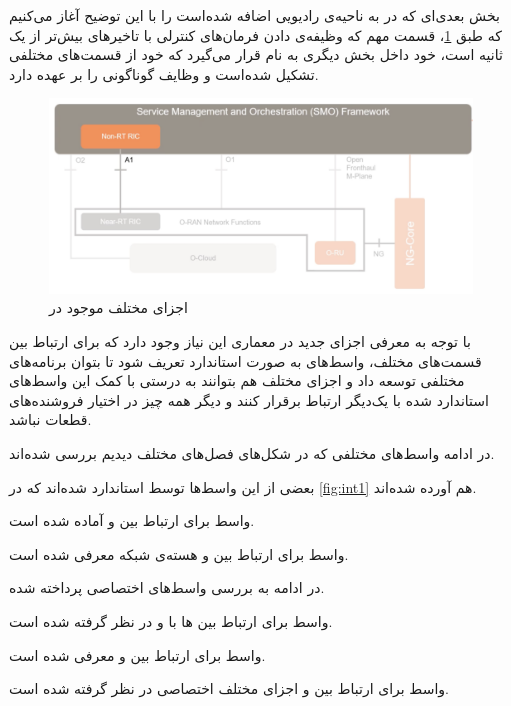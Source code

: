 بخش بعدی‌ای که در 
به ناحیه‌ی رادیویی اضافه شده‌است را با این توضیح آغاز می‌کنیم که طبق 
\ref{fig:nonert-ric1}،
قسمت مهم 
که وظیفه‌ی دادن فرمان‌های کنترلی با تاخیرهای بیش‌تر از یک ثانیه است، خود داخل بخش دیگری به نام
قرار می‌گیرد که خود از قسمت‌های مختلفی تشکیل شده‌است و وظایف گوناگونی را بر عهده دارد.

\begin{figure}[H]
	\includegraphics[width=0.85\columnwidth]{Picture/nonert-ric1.png}
	\centering
	\caption{اجزای مختلف موجود در
		}
	\label{fig:nonert-ric1}
\end{figure}

با توجه به معرفی اجزای جدید در معماری 
این نیاز وجود دارد که برای ارتباط بین قسمت‌های مختلف، واسط‌های به صورت استاندارد تعریف شود تا بتوان برنامه‌های مختلفی توسعه داد و اجزای مختلف هم بتوانند به درستی با کمک این واسط‌های استاندارد شده با یک‌دیگر ارتباط برقرار کنند و دیگر همه چیز در اختیار فروشنده‌های قطعات نباشد.

در ادامه واسط‌های مختلفی که در شکل‌های فصل‌های مختلف دیدیم بررسی شده‌اند.

بعضی از این واسط‌ها توسط 
استاندارد شده‌اند که در 
\ref{fig:int1}
هم آورده شده‌اند. 

واسط
برای ارتباط بین
و
آماده شده است.

واسط
برای ارتباط بین
و هسته‌ی شبکه معرفی شده است.

در ادامه به بررسی واسط‌های اختصاصی
پرداخته شده.

واسط
برای ارتباط بین
ها
با 
و
در نظر گرفته شده است.

واسط
برای ارتباط بین
و 
معرفی شده است.

واسط
برای ارتباط بین
‌و اجزای مختلف اختصاصی 
در نظر گرفته شده است.




